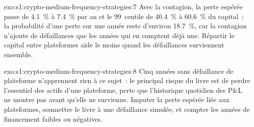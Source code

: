 \begin{solution}{exo:s1:crypto-medium-frequency-strategies:7}
Avec la contagion, la perte espérée passe de 4.1~\% à 7.4~\% par an et le 99~centile de 40.4~\% à 60.6~\% du capital~; la probabilité d'une perte sur une
année reste d'environ 18.7~\%, car la contagion n'ajoute de défaillances que les années qui en comptent déjà une. Répartir le capital entre plateformes aide le moins quand les
défaillances surviennent ensemble.
\end{solution}

\begin{solution}{exo:s1:crypto-medium-frequency-strategies:8}
Cinq années sans défaillance de plateforme n'apprennent rien à ce sujet~: le principal risque du livre est de perdre l'essentiel des actifs d'une plateforme, perte que l'historique quotidien des P\&L
ne montre pas avant qu'elle ne survienne. Imputer la perte espérée liée aux plateformes, soumettre le livre à une défaillance simulée, et compter les années de financement faibles ou négatives.
\end{solution}

